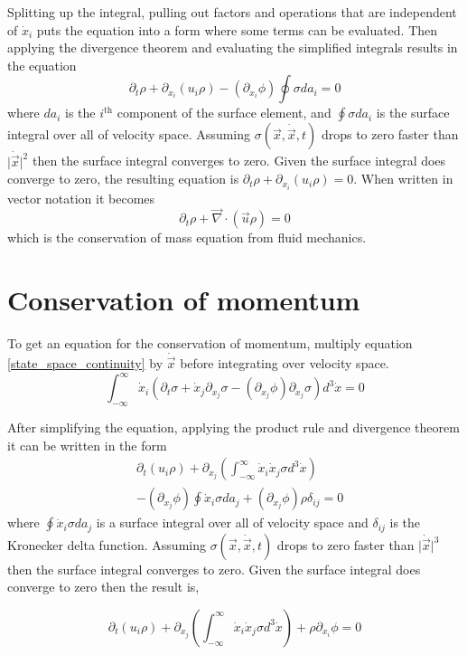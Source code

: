 \documentclass[%
preprint,
 amsmath,amssymb,
 aps,
]{revtex4-1}
\newcommand{\dvec}[1]{\dot{\vec{#1}}}
\newcommand{\grad}{\vec{\nabla}}
\newcommand{\intVdot}[1]{\int_{-\infty}^{\infty} #1 d^3\dot{x}}
\begin{document}
Splitting up the integral, pulling out factors and operations that are independent of $\dot{x}_i$ puts the equation into a form where some terms can be evaluated. Then applying the divergence theorem and evaluating the simplified integrals results in the equation
\[
\partial_t\rho + \partial_{x_i}\left(u_i\rho\right)-\left(\partial_{x_i}\phi\right)\oint{\sigma da_i}=0
\]
where $da_i$ is the $i^{\text{th}}$ component of the surface element, and $\oint{\sigma da_i}$ is the surface integral over all of velocity space. Assuming $\sigma(\vec{x}, \dvec{x}, t)$ drops to zero faster than $\lvert\dvec{x}\rvert^2$ then the surface integral converges to zero. Given the surface integral does converge to zero, the resulting equation is $\partial_t\rho + \partial_{x_i}\left(u_i\rho\right)=0$. When written in vector notation it becomes
\begin{equation}
\partial_t\rho + \grad\cdot\left(\vec{u}\rho\right)=0
\label{conservation_of_mass}
\end{equation}
which is the conservation of mass equation from fluid mechanics.

\section{Conservation of momentum}
To get an equation for the conservation of momentum, multiply equation \eqref{state_space_continuity} by $\dvec{x}$ before integrating over velocity space.
\[
\intVdot{\dot{x}_i\left(\partial_t \sigma + \dot{x}_j\partial_{x_j}\sigma-\left(\partial_{x_j}\phi\right)\partial_{\dot{x}_j}\sigma\right)}=0
\]

After simplifying the equation, applying the product rule and divergence theorem it can be written in the form
\[
\begin{split}
& \partial_t\left(u_i\rho\right) + \partial_{x_j}\left(\intVdot{\dot{x}_i\dot{x}_j\sigma}\right) \\ & - \left(\partial_{x_j}\phi\right)\oint\dot{x}_i\sigma da_j + \left(\partial_{x_j}\phi\right)\rho\delta_{i j}=0
\end{split}
\]
where $\oint\dot{x}_i\sigma da_j$ is a surface integral over all of velocity space and $\delta_{ij}$ is the Kronecker delta function. Assuming $\sigma(\vec{x}, \dvec{x}, t)$ drops to zero faster than $\lvert\dvec{x}\rvert^3$ then the surface integral converges to zero. Given the surface integral does converge to zero then the result is,

\begin{equation}
\partial_t\left(u_i\rho\right) + \partial_{x_j}\left(\intVdot{\dot{x}_i\dot{x}_j\sigma}\right) + \rho\partial_{x_i}\phi=0
\label{conservation_of_momentum}
\end{equation}
\end{document}
